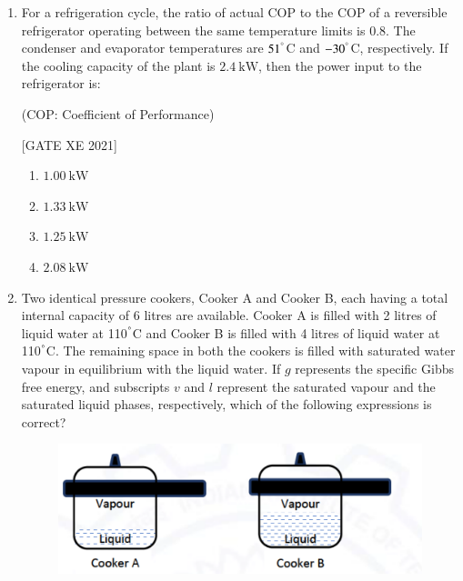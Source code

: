 \documentclass[journal,12pt,onecolumn]{IEEEtran}
\theoremstyle{remark}
\begin{document}
\begin{enumerate}[resume]
\hfill[GATE XE 2021]

\begin{multicols}{2}
\begin{enumerate}
\item $s_{fg} = \dfrac{B\,P_{\text{sat}}\,v_{fg}}{T^2}$
\item $s_{fg} = \dfrac{B}{T^2}$
\item $s_{fg} = v_{fg}\,\dfrac{\mathrm{d}P_{\text{sat}}}{\mathrm{d}T}$
\item $s_{fg} = \dfrac{v_{fg}}{T}$
\end{enumerate}
\end{multicols}


\item For a refrigeration cycle, the ratio of actual COP to the COP of a reversible refrigerator operating between the same temperature limits is 0.8. The condenser and evaporator temperatures are $51^\degree$C and $-30^\degree$C, respectively. If the cooling capacity of the plant is $2.4\ \text{kW}$, then the power input to the refrigerator is:

(COP: Coefficient of Performance)

\hfill[GATE XE 2021]

\begin{multicols}{2}
\begin{enumerate}
\item $1.00\ \text{kW}$
\item $1.33\ \text{kW}$
\item $1.25\ \text{kW}$
\item $2.08\ \text{kW}$
\end{enumerate}
\end{multicols}

\item Two identical pressure cookers, Cooker A and Cooker B, each having a total internal capacity of 6 litres are available. Cooker A is filled with 2 litres of liquid water at 110$^{\degree}$C and Cooker B is filled with 4 litres of liquid water at 110$^{\degree}$C. The remaining space in both the cookers is filled with saturated water vapour in equilibrium with the liquid water. If $g$ represents the specific Gibbs free energy, and subscripts $v$ and $l$ represent the saturated vapour and the saturated liquid phases, respectively, which of the following expressions is correct?

\begin{figure}[H]
      \centering
      \includegraphics[width=0.5\columnwidth]{figs/fig31.png}
      \caption{}
      \label{fig:placeholder}
  \end{figure}


\end{enumerate}
\end{document}
